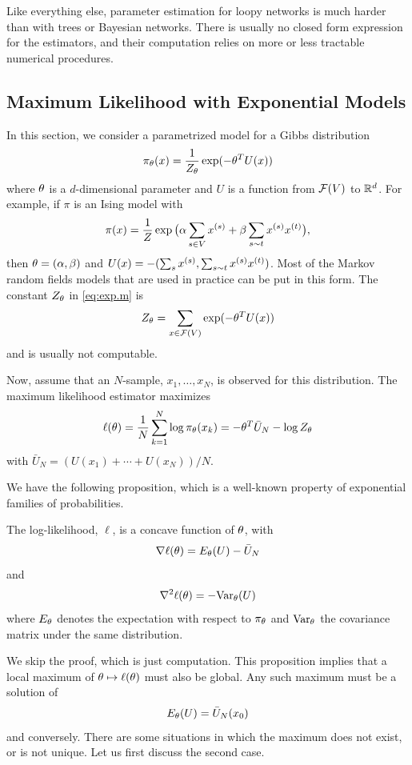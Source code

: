 Like everything else, parameter estimation for loopy networks is much
harder than with trees or Bayesian networks.  There is usually no
closed form expression for the estimators, and their computation relies
on more or less tractable numerical procedures.

\subsection{Maximum Likelihood with Exponential Models}
In this section, we consider a parametrized model for a Gibbs
distribution 
\begin{equation}
\label{eq:exp.m}
\pi_\theta(x) = \frac{1}{Z_\theta} \exp(-\theta^TU(x))
\end{equation}
where $\theta$ is a $d$-dimensional parameter and $U$ is a function from
${\mathcal F}(V)$ to ${\mathbb{R}}^d$. For example, if $\pi$ is an Ising model with
\[
\pi(x) = \frac{1}{Z} \exp\big( \alpha\sum_{s\in V} x^{(s)} + \beta \sum_{s\sim t}
x^{(s)} x^{(t)}\big),
\]
then $\theta = (\alpha, \beta)$ and $U(x) = - (\sum_s x^{(s)},
\sum_{s\sim t} x^{(s)} x^{(t)})$. Most of the Markov random fields models that
are used in practice can be put in this form. The constant $Z_\theta$ in \cref{eq:exp.m} is 
$$
Z_\theta  = \sum_{x\in {\mathcal F}(V)} \exp(-\theta^TU(x))
$$
and is usually not computable.

Now, assume that an $N$-sample, $x_1, \ldots, x_N$, is observed for
this distribution. The maximum likelihood estimator maximizes
$$
\ell(\theta) = \frac{1}{N} \sum_{k=1}^N \log \pi_\theta(x_k) = -\theta^T \bar
U_N - \log Z_\theta
$$
with $\bar U_N = (U(x_1)+\cdots+U(x_N))/N$. 

We have the following proposition, which is a well-known property
of exponential families of probabilities.
\begin{proposition}
\label{prop:ml.exp}
The log-likelihood, $\ell$, is a concave function of $\theta$, with
\begin{equation}
\label{eq:ml.exp.1}
\nabla{\ell}(\theta) = E_\theta(U) - \bar U_N
\end{equation}
and
\begin{equation}
\label{eq:ml.exp.2}
\nabla^2\ell(\theta) = - \text{Var}_\theta(U)
\end{equation}
where $E_\theta$ denotes the expectation with respect to $\pi_\theta$ and
$\text{Var}_\theta$ the covariance matrix under the same distribution.
\end{proposition}

We skip the proof, which is just computation. 
This proposition implies that a local  maximum of $\theta \mapsto
\ell(\theta)$ must also be global. Any such maximum must be a solution of
$$
E_\theta(U) = \bar U_N(x_0)
$$
and conversely.
There are some situations in which the maximum does not exist, or is
not unique. Let us first discuss the second case.

